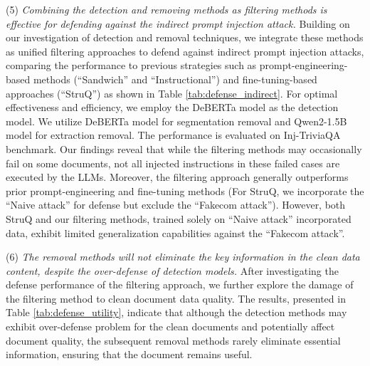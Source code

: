 \vspace{5pt}
(5) \textit{Combining the detection and removing methods as filtering methods is effective for defending against the indirect prompt injection attack.}
Building on our investigation of detection and removal techniques, we integrate these methods as unified filtering approaches to defend against indirect prompt injection attacks, comparing the performance to previous strategies such as prompt-engineering-based methods (``Sandwich'' and ``Instructional'') and fine-tuning-based approaches (``StruQ'') as shown in Table \ref{tab:defense_indirect}. For optimal effectiveness and efficiency, we employ the DeBERTa model as the detection model. We utilize DeBERTa model for segmentation removal and Qwen2-1.5B model for extraction removal. The performance is evaluated on Inj-TriviaQA benchmark.
Our findings reveal that while the filtering methods may occasionally fail on some documents, not all injected instructions in these failed cases are executed by the LLMs. Moreover, the filtering approach generally outperforms prior prompt-engineering and fine-tuning methods (For StruQ, we incorporate the ``Naive attack'' for defense but exclude the ``Fakecom attack''). However, both StruQ and our filtering methods, trained solely on ``Naive attack'' incorporated data, exhibit limited generalization capabilities against the ``Fakecom attack''. 

\vspace{5pt}
(6) \textit{The removal methods will not eliminate the key information in the clean data content, despite the over-defense of detection models.} 
After investigating the defense performance of the filtering approach, we further explore the damage of the filtering method to clean document data quality. The results, presented in Table \ref{tab:defense_utility}, indicate that although the detection methods may exhibit over-defense problem for the clean documents and potentially affect document quality, the subsequent removal methods rarely eliminate essential information, ensuring that the document remains useful.




